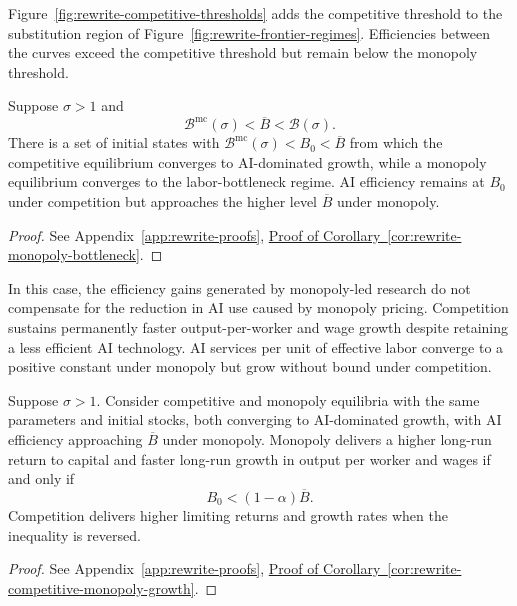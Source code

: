 Figure~\ref{fig:rewrite-competitive-thresholds} adds the competitive
threshold to the substitution region of
Figure~\ref{fig:rewrite-frontier-regimes}. Efficiencies between the
curves exceed the competitive threshold but remain below the monopoly
threshold.



\begin{corollary}
\label{cor:rewrite-monopoly-bottleneck}
Suppose $\sigma>1$ and
\begin{equation}
 \mathcal B^{\mathrm{mc}}(\sigma)<\overline B<\mathcal B(\sigma).
 \label{eq:rewrite-competition-escapes-bottleneck}
\end{equation}
There is a set of initial states with
$\mathcal B^{\mathrm{mc}}(\sigma)<B_0<\overline B$ from which the
competitive equilibrium converges to AI-dominated growth, while a
monopoly equilibrium converges to the labor-bottleneck regime.
AI efficiency remains at $B_0$ under competition but approaches the
higher level $\overline B$ under monopoly.
\end{corollary}
\begin{proof}
See Appendix~\ref{app:rewrite-proofs},
\hyperref[proof:rewrite-monopoly-bottleneck]{Proof of
Corollary~\ref*{cor:rewrite-monopoly-bottleneck}}.
\end{proof}

In this case, the efficiency gains generated by monopoly-led research
do not compensate for the reduction in AI use caused by monopoly pricing. Competition sustains
permanently faster output-per-worker and wage growth despite retaining
a less efficient AI technology. AI services per unit of effective labor
converge to a positive constant under monopoly but grow without bound
under competition. 

\begin{corollary}
\label{cor:rewrite-competitive-monopoly-growth}
Suppose $\sigma>1$. Consider competitive and monopoly equilibria with
the same parameters and initial stocks, both converging to AI-dominated
growth, with AI efficiency approaching $\overline B$ under monopoly.
Monopoly delivers a higher long-run return to capital and faster long-run
growth in output per worker and wages if and only if
\begin{equation}
 B_0<(1-\alpha)\overline B.
 \label{eq:rewrite-competitive-monopoly-growth-comparison}
\end{equation}
Competition delivers higher limiting returns and growth rates when the
inequality is reversed. %
\end{corollary}
\begin{proof}
See Appendix~\ref{app:rewrite-proofs},
\hyperref[proof:rewrite-competitive-monopoly-growth]{Proof of
Corollary~\ref*{cor:rewrite-competitive-monopoly-growth}}.
\end{proof}

